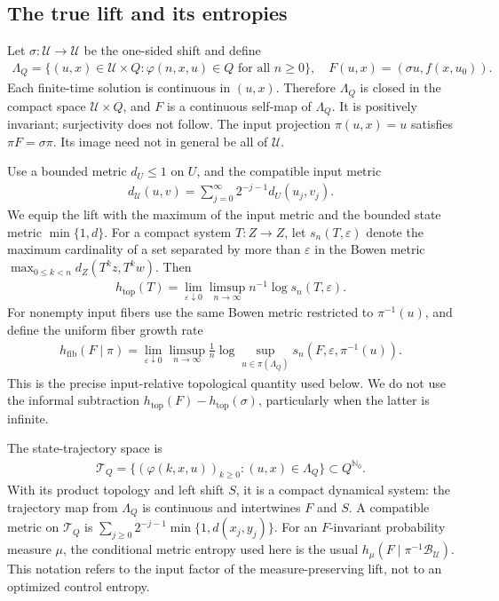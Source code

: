 \documentclass[11pt,a4paper]{article}
\theoremstyle{definition}
\theoremstyle{remark}
\begin{document}
\subsection{The true lift and its entropies}

Let \(\sigma:\mathcal U\to\mathcal U\) be the one-sided shift and define
\begin{align}\label{eq:lift}
 \Lambda_Q=\{(u,x)\in\mathcal U\times Q:
       \varphi(n,x,u)\in Q\text{ for all }n\geq0\},\quad
 F(u,x)=(\sigma u,f(x,u_0)).
\end{align}
Each finite-time solution is continuous in \((u,x)\). Therefore \(\Lambda_Q\) is closed in the compact space \(\mathcal U\times Q\), and \(F\) is a continuous self-map of \(\Lambda_Q\). It is positively invariant; surjectivity does not follow. The input projection \(\pi(u,x)=u\) satisfies \(\pi F=\sigma\pi\). Its image need not in general be all of \(\mathcal U\).

Use a bounded metric \(d_U\leq1\) on \(U\), and the compatible input metric
\begin{align*}
 d_{\mathcal U}(u,v)=\sum_{j=0}^\infty 2^{-j-1}d_U(u_j,v_j).
\end{align*}
We equip the lift with the maximum of the input metric and the bounded state metric \(\min\{1,d\}\). For a compact system \(T:Z\to Z\), let \(s_n(T,\varepsilon)\) denote the maximum cardinality of a set separated by more than \(\varepsilon\) in the Bowen metric
\(\max_{0\leq k<n}d_Z(T^kz,T^kw)\). Then
\begin{align*}
 h_{\mathrm{top}}(T)=\lim_{\varepsilon\downarrow0}\limsup_{n\to\infty}
          n^{-1}\log s_n(T,\varepsilon).
\end{align*}
For nonempty input fibers use the same Bowen metric restricted to \(\pi^{-1}(u)\), and define the uniform fiber growth rate
\begin{align}\label{eq:fiber-definition}
 h_{\mathrm{fib}}(F\mid\pi)=
 \lim_{\varepsilon\downarrow0}\limsup_{n\to\infty}\frac1n
 \log\sup_{u\in\pi(\Lambda_Q)}s_n(F,\varepsilon,\pi^{-1}(u)).
\end{align}
This is the precise input-relative topological quantity used below. We do not use the informal subtraction \(h_{\mathrm{top}}(F)-h_{\mathrm{top}}(\sigma)\), particularly when the latter is infinite.

The state-trajectory space is
\begin{align*}
 \mathcal T_Q=\{(\varphi(k,x,u))_{k\geq0}:(u,x)\in\Lambda_Q\}
       \subset Q^{\mathbb N_0}.
\end{align*}
With its product topology and left shift \(S\), it is a compact dynamical system: the trajectory map from \(\Lambda_Q\) is continuous and intertwines \(F\) and \(S\). A compatible metric on \(\mathcal T_Q\) is
\(\sum_{j\geq0}2^{-j-1}\min\{1,d(x_j,y_j)\}\).
For an \(F\)-invariant probability measure \(\mu\), the conditional metric entropy used here is the usual
\(h_\mu(F\mid\pi^{-1}\mathcal B_{\mathcal U})\). This notation refers to the input factor of the measure-preserving lift, not to an optimized control entropy.
\end{document}
